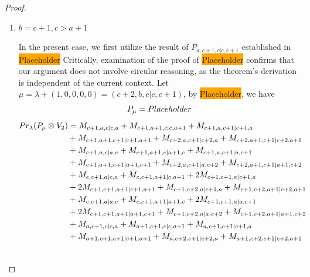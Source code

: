\begin{proof}
\begin{enumerate}
\begin{enumerate}
      \item $b=c+1,c>a+1$\par
        In the present case, we first utilize the result of $P_{a,c+1,c|c,c+1}$ established in \colorbox{orange}{Placeholder} Critically, examination of the proof of \colorbox{orange}{Placeholder} confirms that our argument does not involve circular reasoning, as the theorem's derivation is independent of the current context. Let $\mu = \lambda + (1,0,0,0,0) =(c+2,b,c|c,c+1) $, by \colorbox{orange}{Placeholder}, we have
        \begin{equation}\notag
          \begin{aligned}
            P_\mu = Placeholder
          \end{aligned}
        \end{equation}
        \begin{equation}\notag
          \begin{aligned}
            Pr_{\lambda}(P_\mu \otimes V_{2}) &=
M_{c+1,a,c|c,a}
+ M_{c+1,a+1,c|c,a+1}
+ M_{c+1,a,c+1|c+1,a}\\ 
                                              &
+ M_{c+1,a+1,c+1|c+1,a+1}
+ M_{c+2,a,c+1|c+2,a}
+ M_{c+2,a+1,c+1|c+2,a+1}\\ 
                                              &
+ M_{c+1,a,c|a,c}
+ M_{c+1,a+1,c|a+1,c}
+ M_{c+1,a,c+1|a,c+1}\\ 
                                              &
+ M_{c+1,a+1,c+1|a+1,c+1}
+ M_{c+2,a,c+1|a,c+2}
+ M_{c+2,a+1,c+1|a+1,c+2}\\ 
                                              &
+ M_{c,c+1,a|c,a}
+ M_{c,c+1,a+1|c,a+1}
+ 2M_{c+1,c+1,a|c+1,a}\\ 
                                              &
+ 2M_{c+1,c+1,a+1|c+1,a+1}
+ M_{c+1,c+2,a|c+2,a}
+ M_{c+1,c+2,a+1|c+2,a+1}\\ 
                                              &
+ M_{c,c+1,a|a,c}
+ M_{c,c+1,a+1|a+1,c}
+ 2M_{c+1,c+1,a|a,c+1}\\ 
                                              &
+ 2M_{c+1,c+1,a+1|a+1,c+1}
+ M_{c+1,c+2,a|a,c+2}
+ M_{c+1,c+2,a+1|a+1,c+2}\\ 
                                              &
+ M_{a,c+1,c|c,a}
+ M_{a+1,c+1,c|c,a+1}
+ M_{a,c+1,c+1|c+1,a}\\ 
                                              &
+ M_{a+1,c+1,c+1|c+1,a+1}
+ M_{a,c+2,c+1|c+2,a}
+ M_{a+1,c+2,c+1|c+2,a+1}\\ 
                                              &

\end{aligned}
\end{equation}
\end{enumerate}
\end{enumerate}
\end{proof}
